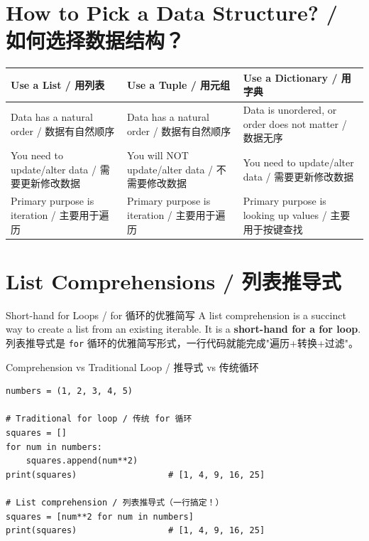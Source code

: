 \documentclass[11pt,a4paper]{report}
\let\oldtexttt\texttt
\renewcommand{\texttt}[1]{\textcolor{mainblue}{\oldtexttt{#1}}}
\begin{document}
\section{How to Pick a Data Structure? / 如何选择数据结构？}

\medskip
\centering
\renewcommand{\arraystretch}{1.8}
\begin{tabular}{@{}p{4cm}p{4cm}p{4cm}@{}}
\toprule
\textbf{Use a List / 用列表} & \textbf{Use a Tuple / 用元组} & \textbf{Use a Dictionary / 用字典} \\ \midrule
Data has a natural order / 数据有自然顺序 & Data has a natural order / 数据有自然顺序 & Data is unordered, or order does not matter / 数据无序 \\
You need to update/alter data / 需要更新修改数据 & You will NOT update/alter data / 不需要修改数据 & You need to update/alter data / 需要更新修改数据 \\
Primary purpose is iteration / 主要用于遍历 & Primary purpose is iteration / 主要用于遍历 & Primary purpose is looking up values / 主要用于按键查找 \\ \bottomrule
\end{tabular}
\medskip

\section{List Comprehensions / 列表推导式}

\begin{concept}{Short-hand for Loops / for 循环的优雅简写}
    A list comprehension is a succinct way to create a list from an existing iterable. It is a \textbf{short-hand for a for loop}. \\
    列表推导式是 \texttt{for} 循环的优雅简写形式，一行代码就能完成"遍历+转换+过滤"。
\end{concept}

\begin{examplebox}{Comprehension vs Traditional Loop / 推导式 vs 传统循环}
\begin{lstlisting}
numbers = (1, 2, 3, 4, 5)

# Traditional for loop / 传统 for 循环
squares = []
for num in numbers:
    squares.append(num**2)
print(squares)                  # [1, 4, 9, 16, 25]

# List comprehension / 列表推导式（一行搞定！）
squares = [num**2 for num in numbers]
print(squares)                  # [1, 4, 9, 16, 25]
\end{lstlisting}
\end{examplebox}
\end{document}
